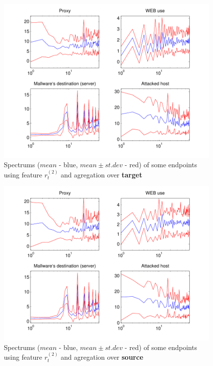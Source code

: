\documentclass[a4paper]{IEEEtran}
\begin{document}
\begin{figure}[t!]%
  \centering
  \includegraphics[width=150mm]{spect_dst_logp}
  \caption{Spectrums ($mean$ - blue, $mean\pm st.dev$ - red) of some  endpoints using feature $r_t^{(2)}$ and agregation over \textbf{target}}
  \label{fig:spect_dst_logp}
\end{figure}
\begin{figure}[t!]%
  \centering
  \includegraphics[width=150mm]{spect_src_logp}
  \caption{Spectrums ($mean$ - blue, $mean\pm st.dev$ - red) of some  endpoints using feature $r_t^{(2)}$ and agregation over \textbf{source}}
  \label{fig:spect_src_logp}
\end{figure}
\end{document}
